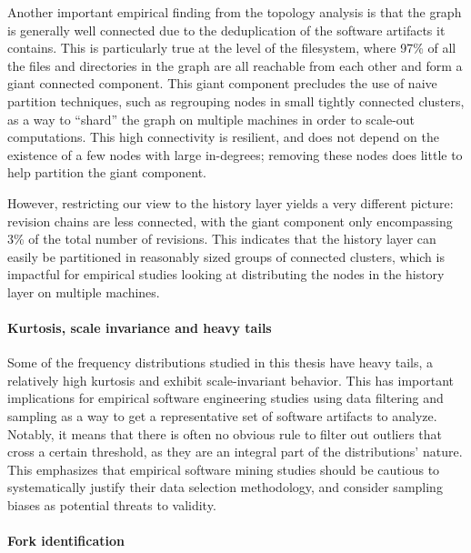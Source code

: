 Another important empirical finding from the topology analysis is that the
graph is generally well connected due to the deduplication of the software
artifacts it contains. This is particularly true at the level of the
filesystem, where 97\% of all the files and directories in the graph are all
reachable from each other and form a giant connected component. This giant
component precludes the use of naive partition techniques, such as regrouping
nodes in small tightly connected clusters, as a way to ``shard'' the graph on
multiple machines in order to scale-out computations. This high connectivity is
resilient, and does not depend on the existence of a few nodes with large
in-degrees; removing these nodes does little to help partition the giant
component.

However, restricting our view to the history layer yields a very different
picture: revision chains are less connected, with the giant component only
encompassing 3\% of the total number of revisions. This indicates that the
history layer can easily be partitioned in reasonably sized groups of connected
clusters, which is impactful for empirical studies looking at distributing the
nodes in the history layer on multiple machines.

\paragraph*{Kurtosis, scale invariance and heavy tails}

Some of the frequency distributions studied in this thesis have heavy tails,
a relatively high kurtosis and exhibit scale-invariant behavior. This has
important implications for empirical software engineering studies using data
filtering and sampling as a way to get a representative set of software
artifacts to analyze. Notably, it means that there is often no obvious rule to
filter out outliers that cross a certain threshold, as they are an integral
part of the distributions' nature. This emphasizes that empirical software
mining studies should be cautious to systematically justify their data
selection methodology, and consider sampling biases as potential threats to
validity.

\paragraph*{Fork identification}

